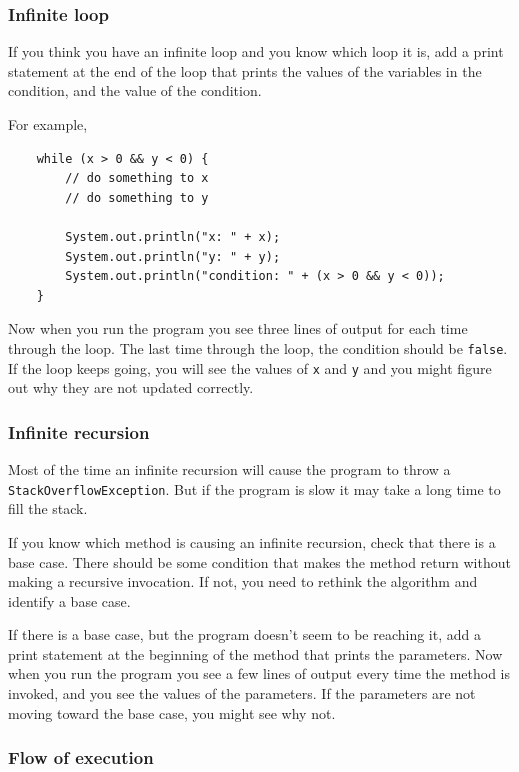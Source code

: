 \documentclass[12pt]{book}
\theoremstyle{exercise}
\begin{document}
\subsubsection*{Infinite loop}

If you think you have an infinite loop and you know
which loop it is, add a print statement at
the end of the loop that prints the values of the variables in
the condition, and the value of the condition.

For example,

\begin{lstlisting}
    while (x > 0 && y < 0) {
        // do something to x
        // do something to y

        System.out.println("x: " + x);
        System.out.println("y: " + y);
        System.out.println("condition: " + (x > 0 && y < 0));
    }
\end{lstlisting}
%
Now when you run the program you see three lines of output
for each time through the loop.  The last time through the
loop, the condition should be {\tt false}.  If the loop keeps
going, you will see the values of {\tt x} and {\tt y}
and you might figure out why they are not updated correctly.


\subsubsection*{Infinite recursion}

Most of the time an infinite recursion will cause the program
to throw a {\tt StackOverflowException}.  But if the program is
slow it may take a long time to fill the stack.

If you know which method is causing an infinite recursion, check that
there is a base case.  There should be some condition
that makes the method return without making a recursive
invocation.  If not, you need to rethink the algorithm and
identify a base case.

If there is a base case, but the program doesn't seem to be reaching
it, add a print statement at the beginning of the method that prints
the parameters.  Now when you run the program you see a few lines
of output every time the method is invoked, and you see the values of
the parameters.  If the parameters are not moving toward the base case,
you might see why not.


\subsubsection*{Flow of execution}
\end{document}
